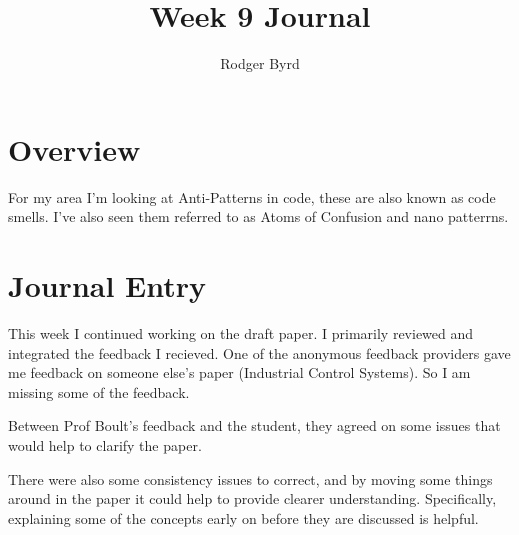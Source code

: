 \documentclass[conference]{IEEEtran}
\begin{document}

\title{Week 9 Journal}
\author{Rodger Byrd}
\maketitle


\section{Overview}
For my area I'm looking at Anti-Patterns in code, these are also known as code smells. I've also seen them referred to as Atoms of Confusion and nano patterrns.

\section{Journal Entry}
This week I continued working on the draft paper. I primarily reviewed and integrated the feedback I recieved. One of the anonymous feedback providers gave me feedback on someone else's paper (Industrial Control Systems). So I am missing some of the feedback. 

Between Prof Boult's feedback and the student, they agreed on some issues that would help to clarify the paper.

There were also some consistency issues to correct, and by moving some things around in the paper it could help to provide clearer understanding. Specifically, explaining some of the concepts early on before they are discussed is helpful.




\nocite{*}
\clearpage


%
%
\end{document}
